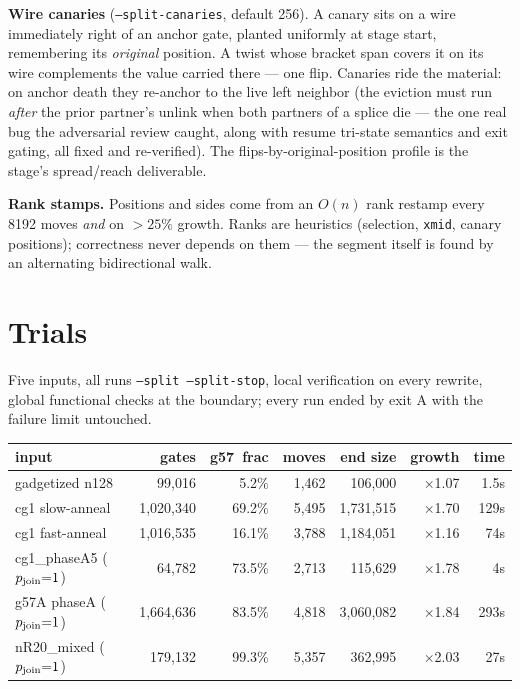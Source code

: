 \documentclass[11pt]{article}
\newcommand{\g}{\textsf{g57}}
\begin{document}
\textbf{Wire canaries} (\texttt{--split-canaries}, default 256). A canary
sits on a wire immediately right of an anchor gate, planted uniformly at
stage start, remembering its \emph{original} position. A twist whose bracket
span covers it on its wire complements the value carried there --- one flip.
Canaries ride the material: on anchor death they re-anchor to the live left
neighbor (the eviction must run \emph{after} the prior partner's unlink when
both partners of a splice die --- the one real bug the adversarial review
caught, along with resume tri-state semantics and exit gating, all fixed and
re-verified). The flips-by-original-position profile is the stage's
spread/reach deliverable.

\textbf{Rank stamps.} Positions and sides come from an $O(n)$ rank restamp
every 8192 moves \emph{and} on $>25\%$ growth. Ranks are heuristics
(selection, \texttt{xmid}, canary positions); correctness never depends on
them --- the segment itself is found by an alternating bidirectional walk.

\section{Trials}

Five inputs, all runs \texttt{--split --split-stop}, local verification on
every rewrite, global functional checks at the boundary; every run ended by
exit A with the failure limit untouched.

\begin{center}
\small
\begin{tabular}{lrrrrrr}
\toprule
input & gates & \g\ frac & moves & end size & growth & time \\
\midrule
gadgetized n128 & 99{,}016 & 5.2\% & 1{,}462 & 106{,}000 & $\times$1.07 & 1.5s \\
cg1 slow-anneal & 1{,}020{,}340 & 69.2\% & 5{,}495 & 1{,}731{,}515 & $\times$1.70 & 129s \\
cg1 fast-anneal & 1{,}016{,}535 & 16.1\% & 3{,}788 & 1{,}184{,}051 & $\times$1.16 & 74s \\
cg1\_phaseA5 ($p_{\rm join}{=}1$) & 64{,}782 & 73.5\% & 2{,}713 & 115{,}629 & $\times$1.78 & 4s \\
g57A phaseA ($p_{\rm join}{=}1$) & 1{,}664{,}636 & 83.5\% & 4{,}818 & 3{,}060{,}082 & $\times$1.84 & 293s \\
nR20\_mixed ($p_{\rm join}{=}1$) & 179{,}132 & 99.3\% & 5{,}357 & 362{,}995 & $\times$2.03 & 27s \\
\bottomrule
\end{tabular}
\end{center}
\end{document}
